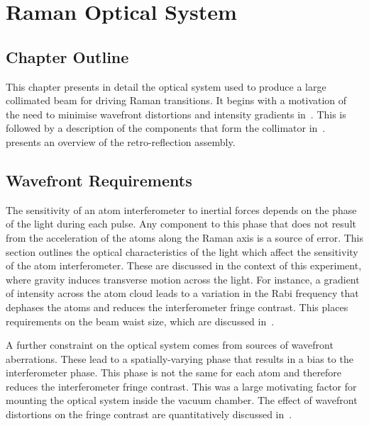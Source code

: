 \chapter{Raman Optical System}\label{chap:raman_optics}

\section{Chapter Outline}
This chapter presents in detail the optical system used to produce a
large collimated beam for driving Raman transitions. It begins with a
motivation of the need to minimise wavefront distortions and intensity
gradients
in~. This is followed by a description
of the components that form the collimator
in~.
 presents an overview of the
retro-reflection assembly.
\section{Wavefront Requirements}\label{sec:wavefront_req}
The sensitivity of an atom interferometer to inertial forces depends
on the phase of the light during each pulse. Any component to this
phase that does not result from the acceleration of the atoms along
the Raman axis is a source of error. 
This section
outlines the optical characteristics of the light which affect the
sensitivity of the atom interferometer. These are discussed in the
context of this experiment, where gravity induces transverse motion
across the light. For instance, a gradient of intensity across
the atom cloud leads to a variation in the Rabi frequency that
dephases the atoms and reduces the interferometer fringe contrast.
This places requirements on the beam waist size, which are discussed
in~. 

\par\noindent A further constraint on the optical system comes from
sources of wavefront aberrations. These lead to a spatially-varying
phase that results in a bias to the interferometer phase.
This phase is not the same for each atom and therefore reduces the
interferometer fringe contrast. This was a large motivating factor
for mounting the optical system inside the vacuum chamber. The effect
of wavefront distortions on the fringe contrast are quantitatively
discussed in~.
